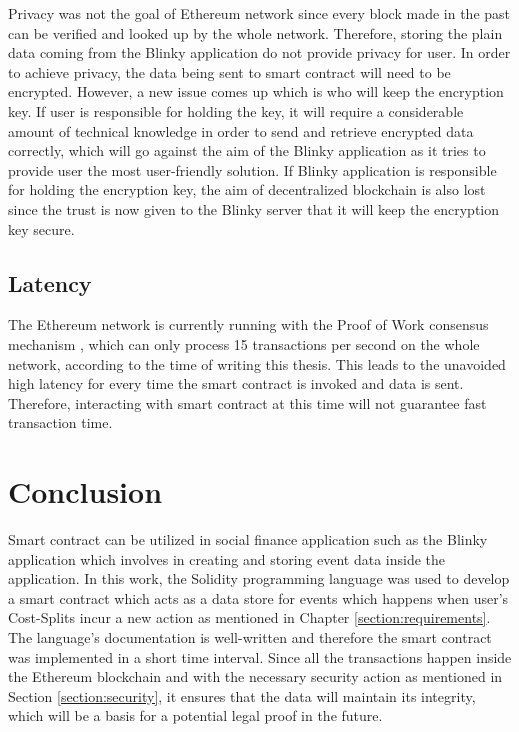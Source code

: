 \documentclass[twoside,numperchapter]{tutthesis} %
\begin{document}
Privacy was not the goal of Ethereum network since every block made in the past can be verified and looked up by the whole network. Therefore, storing the plain data coming from the Blinky application do not provide privacy for user. In order to achieve privacy, the data being sent to smart contract will need to be encrypted. However, a new issue comes up which is who will keep the encryption key. If user is responsible for holding the key, it will require a considerable amount of technical knowledge in order to send and retrieve encrypted data correctly, which will go against the aim of the Blinky application as it tries to provide user the most user-friendly solution. If Blinky application is responsible for holding the encryption key, the aim of decentralized blockchain is also lost since the trust is now given to the Blinky server that it will keep the encryption key secure.

\section{Latency}

The Ethereum network is currently running with the Proof of Work consensus mechanism \citep{RefWorks:doc:BitcoinWhitepaper}, which can only process 15 transactions per second on the whole network, according to the time of writing this thesis. This leads to the unavoided high latency for every time the smart contract is invoked and data is sent. Therefore, interacting with smart contract at this time will not guarantee fast transaction time.

\chapter{Conclusion}
\label{ch:conclusion}

Smart contract can be utilized in social finance application such as the Blinky application which involves in creating and storing event data inside the application. In this work, the Solidity programming language was used to develop a smart contract which acts as a data store for events which happens when user's Cost-Splits incur a new action as mentioned in Chapter \ref{section:requirements}. The language's documentation is well-written and therefore the smart contract was implemented in a short time interval. Since all the transactions happen inside the Ethereum blockchain and with the necessary security action as mentioned in Section \ref{section:security}, it ensures that the data will maintain its integrity, which will be a basis for a potential legal proof in the future.
\end{document}
